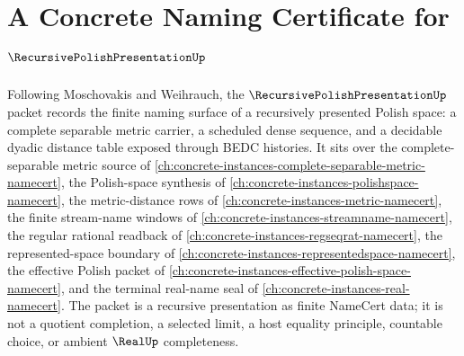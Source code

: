 \chapter{A Concrete Naming Certificate for $\RecursivePolishPresentationUp$}
\label{ch:concrete-instances-recursive-polish-presentation-namecert}

Following Moschovakis and Weihrauch, the $\RecursivePolishPresentationUp$ packet records the finite naming surface of a recursively presented Polish space: a complete separable metric carrier, a scheduled dense sequence, and a decidable dyadic distance table exposed through BEDC histories. It sits over the complete-separable metric source of \autoref{ch:concrete-instances-complete-separable-metric-namecert}, the Polish-space synthesis of \autoref{ch:concrete-instances-polishspace-namecert}, the metric-distance rows of \autoref{ch:concrete-instances-metric-namecert}, the finite stream-name windows of \autoref{ch:concrete-instances-streamname-namecert}, the regular rational readback of \autoref{ch:concrete-instances-regseqrat-namecert}, the represented-space boundary of \autoref{ch:concrete-instances-representedspace-namecert}, the effective Polish packet of \autoref{ch:concrete-instances-effective-polish-space-namecert}, and the terminal real-name seal of \autoref{ch:concrete-instances-real-namecert}. The packet is a recursive presentation as finite NameCert data; it is not a quotient completion, a selected limit, a host equality principle, countable choice, or ambient $\RealUp$ completeness.

